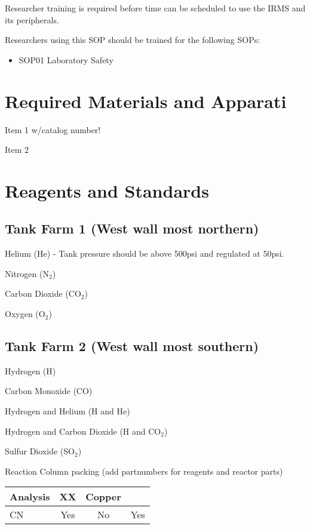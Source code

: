 \documentclass[12pt]{../SOP3_beta}\usepackage[]{graphicx}\usepackage[]{color}
\begin{document}
\NP Researcher training is required before time can be scheduled to use the IRMS and its peripherals.

\NP Researchers using this SOP should be trained for the following SOPs:

\begin{itemize}
  \item SOP01 Laboratory Safety
\end{itemize}

\section{Required Materials and Apparati}

\NP Item 1 w/catalog number!

\NP Item 2

\section{Reagents and Standards}

\subsection{Tank Farm 1 (West wall most northern)}

\NP Helium (He) - Tank pressure should be above 500psi and regulated at 50psi.

\NP Nitrogen (N$_2$)

\NP Carbon Dioxide (CO$_2$)

\NP Oxygen (O$_2$)

\subsection{Tank Farm 2 (West wall most southern)}

\NP Hydrogen (H)

\NP Carbon Monoxide (CO)

\NP Hydrogen and Helium (H and He)

\NP Hydrogen and Carbon Dioxide (H and CO$_2$)

\NP Sulfur Dioxide (SO$_2$)

\NP Reaction Column packing (add partnumbers for reagents and reactor parts)

\begin{table}[h]
\begin{tabular}{lccc} \hline
Analysis      & XX    & Copper  & \\ \hline\hline
CN            & Yes   & No      & Yes \\ \hline


\end{tabular}
\end{table}
\end{document}
